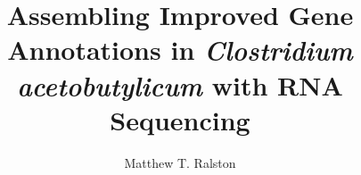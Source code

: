 % 
%

\title[Assembling Improved Gene Annotations in Clostridium acetobutylicum with RNA Sequencing]{Assembling Improved Gene Annotations in \textit{Clostridium acetobutylicum} with RNA Sequencing}
\author{Matthew T. Ralston}
\majorfieldtrue{}
\subject{Master of Science in Bioinformatics and Computational Biology}

\maketitlepage %

\begin{approvalpage}
\end{approvalpage}

\begin{front} %







\maketocloflot




\end{front}

